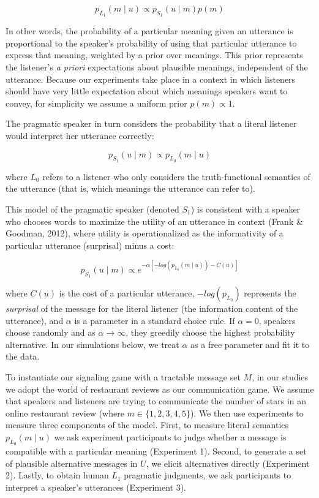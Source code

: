 \documentclass[10pt, letterpaper]{article}
\begin{document}
\[p_{L_1}(m \mid u) \propto p_{S_1} (u \mid m) p(m) \tag{1}\]

\noindent In other words, the probability of a particular meaning given
an utterance is proportional to the speaker's probability of using that
particular utterance to express that meaning, weighted by a prior over
meanings. This prior represents the listener's \emph{a priori}
expectations about plausible meanings, independent of the utterance.
Because our experiments take place in a context in which listeners
should have very little expectation about which meanings speakers want
to convey, for simplicity we assume a uniform prior \(p(m) \propto 1\).

The pragmatic speaker in turn considers the probability that a literal
listener would interpret her utterance correctly:

\[p_{S_1}(u \mid m) \propto p_{L_0} (m \mid u) \tag{2}\]

\noindent where \(L_0\) refers to a listener who only considers the
truth-functional semantics of the utterance (that is, which meanings the
utterance can refer to).

This model of the pragmatic speaker (denoted \(S_1\)) is consistent with
a speaker who chooses words to maximize the utility of an utterance in
context (Frank \& Goodman, 2012), where utility is operationalized as
the informativity of a particular utterance (surprisal) minus a cost:

\[p_{S_1}(u \mid m) \propto e^{-\alpha[-log(p_{L_0}(m \mid u)) - C(u)]} \tag{3}\]

\noindent where \(C(u)\) is the cost of a particular utterance,
\(-log(p_{L_0})\) represents the \emph{surprisal} of the message for the
literal listener (the information content of the utterance), and
\(\alpha\) is a parameter in a standard choice rule. If \(\alpha=0\),
speakers choose randomly and as \(\alpha \rightarrow \infty\), they
greedily choose the highest probability alternative. In our simulations
below, we treat \(\alpha\) as a free parameter and fit it to the data.

To instantiate our signaling game with a tractable message set \(M\), in
our studies we adopt the world of restaurant reviews as our
communication game. We assume that speakers and listeners are trying to
communicate the number of stars in an online restaurant review (where
\(m \in \{1, 2, 3, 4, 5\}\)). We then use experiments to measure three
components of the model. First, to measure literal semantics
\({p_{L_0} (m \mid u)}\) we ask experiment participants to judge whether
a message is compatible with a particular meaning (Experiment 1).
Second, to generate a set of plausible alternative messages in \(U\), we
elicit alternatives directly (Experiment 2). Lastly, to obtain human
\(L_1\) pragmatic judgments, we ask participants to interpret a
speaker's utterances (Experiment 3).
\end{document}
